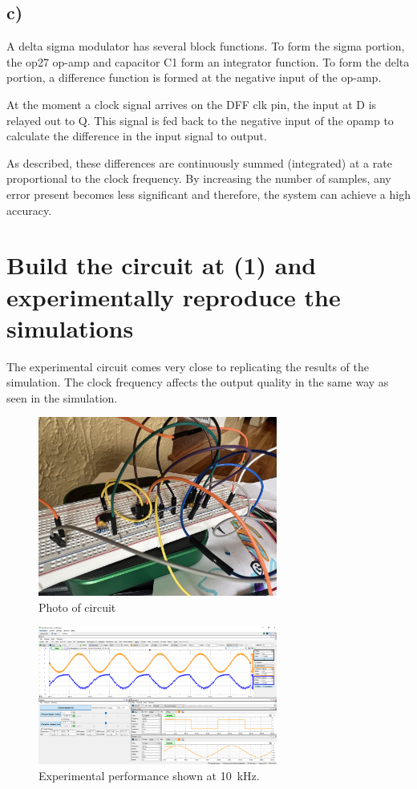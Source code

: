 \documentclass{article}
\begin{document}
	\subsection*{c)}

	A delta sigma modulator has several block functions. To form the sigma portion, the op27 op-amp and capacitor C1 form an integrator function. To form the delta portion, a difference function is formed at the negative input of the op-amp. 

	At the moment a clock signal arrives on the DFF clk pin, the input at D is relayed out to Q. This signal is fed back to the negative input of the opamp to calculate the difference in the input signal to output.

	As described, these differences are continuously summed (integrated) at a rate proportional to the clock frequency. By increasing the number of samples, any error present becomes less significant and therefore, the system can achieve a high accuracy.

	\section{Build the circuit at (1) and experimentally reproduce the simulations}

	The experimental circuit comes very close to replicating the results of the simulation. The clock frequency affects the output quality in the same way as seen in the simulation.


	\begin{figure}[H]
	    \centering
	    \includegraphics[width=0.7\textwidth]{2a1}
	    \caption{Photo of circuit}
	\end{figure}

	\begin{figure}[H]
	    \centering
	    \includegraphics[width=0.7\textwidth]{2a2_10}
	    \caption{Experimental performance shown at \SI{10}{\kHz}. }
	\end{figure}
\end{document}
